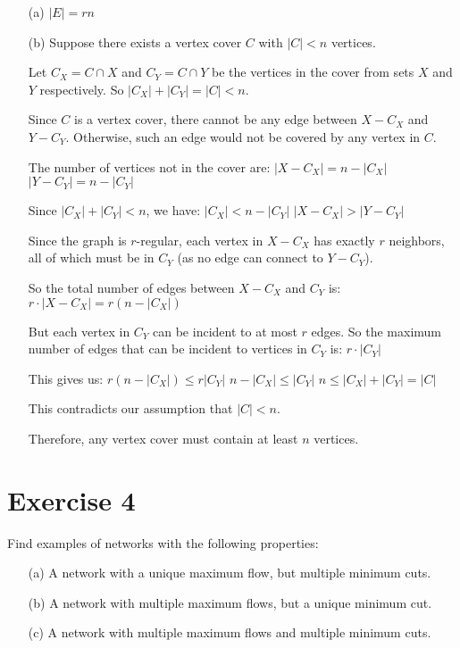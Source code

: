 \documentclass{article}
\begin{document}
\begin{itemize}
    \item[(a)] $|E| = rn$

    \item[(b)] Suppose there exists a vertex cover $C$ with $|C| < n$ vertices.

    Let $C_X = C \cap X$ and $C_Y = C \cap Y$ be the vertices in the cover from sets $X$ and $Y$ respectively.
    So $|C_X| + |C_Y| = |C| < n$.
    
    Since $C$ is a vertex cover, there cannot be any edge between $X - C_X$ and $Y - C_Y$.
    Otherwise, such an edge would not be covered by any vertex in $C$.
    
    The number of vertices not in the cover are:
    $|X - C_X| = n - |C_X|$
    $|Y - C_Y| = n - |C_Y|$
    
    Since $|C_X| + |C_Y| < n$, we have:
    $|C_X| < n - |C_Y|$
    $|X - C_X| > |Y - C_Y|$
    
    Since the graph is $r$-regular, each vertex in $X - C_X$ has exactly $r$ neighbors, all of which must be in $C_Y$ (as no edge can connect to $Y - C_Y$).
    
    So the total number of edges between $X - C_X$ and $C_Y$ is:
    $r \cdot |X - C_X| = r(n - |C_X|)$
    
    But each vertex in $C_Y$ can be incident to at most $r$ edges.
    So the maximum number of edges that can be incident to vertices in $C_Y$ is:
    $r \cdot |C_Y|$
    
    This gives us:
    $r(n - |C_X|) \leq r|C_Y|$
    $n - |C_X| \leq |C_Y|$
    $n \leq |C_X| + |C_Y| = |C|$
    
    This contradicts our assumption that $|C| < n$.
    
    Therefore, any vertex cover must contain at least $n$ vertices.
\end{itemize}

\newpage

\section*{Exercise 4}
Find examples of networks with the following properties:

\begin{itemize}
    \item[(a)] A network with a unique maximum flow, but multiple minimum cuts.
    \item[(b)] A network with multiple maximum flows, but a unique minimum cut.
    \item[(c)] A network with multiple maximum flows and multiple minimum cuts.
\end{itemize}
\end{document}
